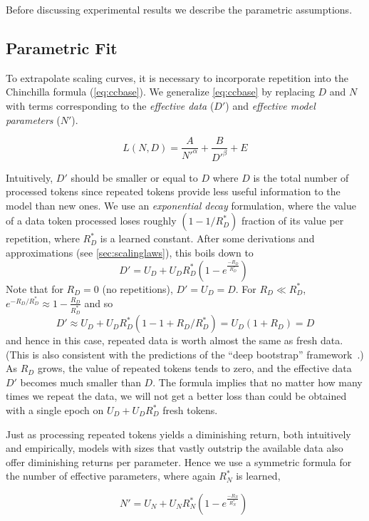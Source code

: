 \documentclass{article}
\begin{document}
Before discussing experimental results we describe the parametric assumptions.

\subsection{Parametric Fit} \label{sec:parametricfit}

To extrapolate scaling curves, it is necessary to incorporate repetition into the Chinchilla formula (\autoref{eq:ccbase}). We generalize \autoref{eq:ccbase} by replacing $D$ and $N$ with terms corresponding to the \emph{effective data} ($D'$) and \emph{effective model parameters} ($N'$).

\[L(N,D)=\frac{A}{N'^\alpha} + \frac{B}{D'^\beta} + E   \]

Intuitively, $D'$ should be smaller or equal to $D$ where $D$ is the total number of processed tokens since repeated tokens provide less useful information to the model than new ones.
We use an \emph{exponential decay} formulation, where the value of a data token processed loses roughly $(1-1/R^*_D)$ fraction of its value per repetition, where $R^*_D$ is a learned constant. 
After some derivations and approximations (see \autoref{sec:scalinglaws}), this boils down to 
\begin{equation}
D' = U_D + U_D R_D^* (1 - e^{\frac{-R_D}{R_D^*}}) \;\label{eq:repd}
\end{equation}
Note that for $R_D=0$ (no repetitions), $D'=U_D=D$.
For $R_D  \ll R^*_D$, $e^{-R_D/R^*_D}\approx 1- \tfrac{R_D}{R^*_D}$ and so \[
D' \approx U_D + U_DR^*_D(1-1+ R_D/R^*_D) = U_D(1+R_D)=D \]
and hence in this case, repeated data is worth almost the same as fresh data.
(This is also consistent with the predictions of the ``deep bootstrap'' framework~\cite{NakkiranNS21}.)
As $R_D$ grows, the value of repeated tokens tends to zero, and the effective data $D'$ becomes much smaller than $D$.
The formula implies that no matter how many times we repeat the data, we will not get a better loss than could be obtained with a single epoch on  $U_D + U_DR^*_D$ fresh tokens.

Just as processing repeated tokens yields a diminishing return, both intuitively and empirically, models with sizes that vastly outstrip the available data also offer diminishing returns per parameter.
Hence we use a symmetric formula for the number of effective parameters, where again $R^*_N$ is learned,

\begin{equation}\label{eq:repn}
N' = U_N + U_N R_N^* (1 - e^{\frac{-R_N}{R_N^*}}) \;
\end{equation}
\end{document}
